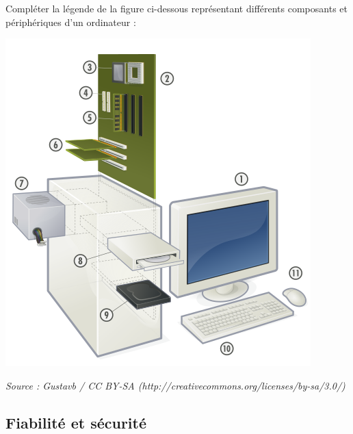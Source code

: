 \begin{exerciceB}{}

Compléter la légende de la figure ci-dessous représentant différents composants et périphériques d'un ordinateur :


\begin{center}
\includegraphics[scale=0.6]{446px-Personal_computer,_exploded_4.svg.png}

\medskip

{\itshape Source : Gustavb / CC BY-SA (http://creativecommons.org/licenses/by-sa/3.0/)}
\end{center}

\end{exerciceB}


\subsection{Fiabilité et sécurité}

